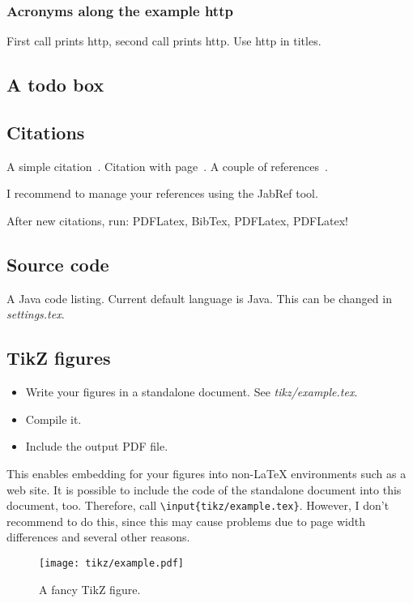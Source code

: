 \subsubsection{Acronyms along the example \acs{http}}

First call prints \ac{http}, second call prints \ac{http}. Use \acs{http} in titles.

\subsection{A todo box}


\subsection{Citations}

A simple citation~\cite{rfc791}. Citation with page~\cites[p.~12]{rfc2068}. A couple of references~\cites[p.~12;]{rfc2068}{rfc791}.


I recommend to manage your references using the JabRef tool.

After new citations, run: PDFLatex, BibTex, PDFLatex, PDFLatex!

\subsection{Source code}

A Java code listing. Current default language is Java. This can be changed in \textit{settings.tex}.



\subsection{TikZ figures}

\begin{itemize}
\item Write your figures in a standalone document. See \textit{tikz/example.tex}.
\item Compile it.
\item Include the output PDF file.
\end{itemize}

This enables embedding for your figures into non-\LaTeX{} environments such as a web site. It is possible to include the code of the standalone document into this document, too. Therefore, call \verb#\#\verb#input{tikz/example.tex}#. However, I don't recommend to do this, since this may cause problems due to page width differences and several other reasons.

\begin{figure}[ht]
	\centering
	
	\texttt{[image: tikz/example.pdf]}
        
    \caption{A fancy TikZ figure.}
    \label{fig5:projectstack}
\end{figure}

